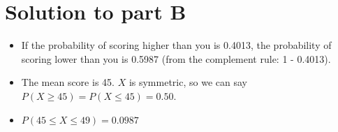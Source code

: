 \documentclass[a4paper,12pt]{article}
\begin{document}
		\section*{Solution to part B}
\begin{itemize}	
\item If the probability of scoring higher than you is 0.4013, the probability of scoring lower than you is 0.5987  
	(from the complement rule: 1 - 0.4013).
\item The mean score is 45. $X$ is symmetric, so we can say $P(X \geq 45) = P(X \leq 45) = 0.50$.
\item $P(45 \leq X \leq 49) = 0.0987$
\end{itemize}	
	
\end{document}
